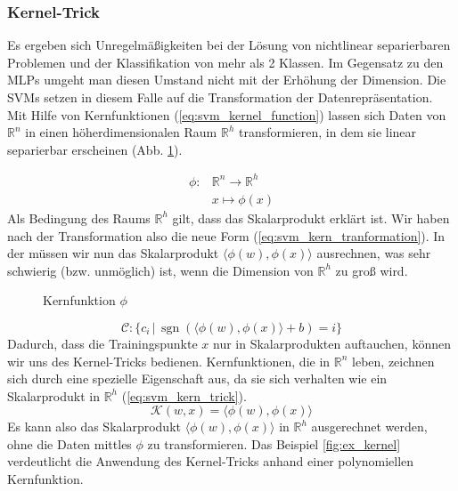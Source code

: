 \subsubsection{Kernel-Trick}
Es ergeben sich Unregelmäßigkeiten bei der Lösung von nichtlinear separierbaren Problemen und der Klassifikation von mehr als 2 Klassen.
Im Gegensatz zu den MLPs umgeht man diesen Umstand nicht mit der Erhöhung der Dimension. 
Die \ac{SVM}s setzen in diesem Falle auf die Transformation der Datenrepräsentation. 
Mit Hilfe von Kernfunktionen (\ref{eq:svm_kernel_function}) lassen sich Daten von $\mathbb{R}^n$ in einen höherdimensionalen Raum $\mathbb{R}^h$ transformieren, in dem sie linear separierbar erscheinen (Abb. \ref{fig:svm_kernel}). 

\begin{equation}
\label{eq:svm_kernel_function}
\begin{split}
    \phi : & \mathbb{R}^n \to \mathbb{R}^h \\
    & x \mapsto \phi(x)
\end{split} 
\end{equation}
Als Bedingung des Raums $\mathbb{R}^h$ gilt, dass das Skalarprodukt erklärt ist. 
Wir haben nach der Transformation also die neue Form (\ref{eq:svm_kern_tranformation}). 
In der müssen wir nun das Skalarprodukt $\langle\phi(w),\phi(x)\rangle$ ausrechnen, was sehr schwierig (bzw. unmöglich) ist, wenn die Dimension von $\mathbb{R}^h$ zu groß wird.
\begin{figure}[htbp] \centering
    \caption{Kernfunktion $\phi$}
    \label{fig:svm_kernel}
\end{figure}
\begin{equation}
\label{eq:svm_kern_tranformation}
    \mathcal{C}: \{ c_i \,|\, \operatorname{sgn}(\langle \phi(w),\phi(x) \rangle + b) = i \}
\end{equation}
Dadurch, dass die Trainingspunkte $x$ nur in Skalarprodukten auftauchen, können wir uns des Kernel-Tricks bedienen.
Kernfunktionen, die in $\mathbb{R}^n$ leben, zeichnen sich durch eine spezielle Eigenschaft aus, da sie sich verhalten wie ein Skalarprodukt in $\mathbb{R}^h$ (\ref{eq:svm_kern_trick}). 
\begin{equation}
\label{eq:svm_kern_trick}
    \mathcal{K}(w,x) = \langle\phi(w),\phi(x)\rangle
\end{equation}
Es kann also das Skalarprodukt $\langle\phi(w),\phi(x)\rangle$ in $\mathbb{R}^h$ ausgerechnet werden, ohne die Daten mittles $\phi$ zu transformieren. 
Das Beispiel \ref{fig:ex_kernel} verdeutlicht die Anwendung des Kernel-Tricks  anhand einer polynomiellen Kernfunktion.

